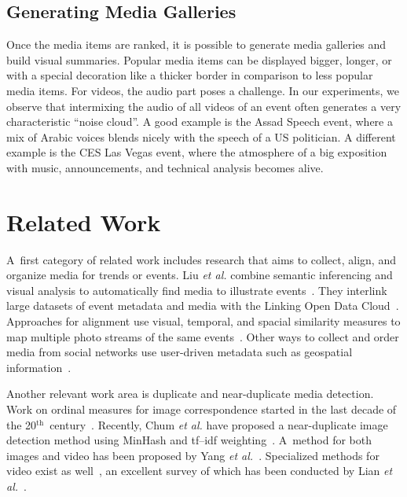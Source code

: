 \documentclass{acm_proc_article-sp}
\let\oldemph\emph
\renewcommand{\emph}[1]{\oldemph{\fontsize{9}{9}\selectfont #1}}
\newcommand{\superscript}[1]{\ensuremath{^{\textrm{#1}}}}
\begin{document}
\subsection{Generating Media Galleries}
Once the media items are ranked, it is possible to generate media galleries and build visual summaries. Popular media items can be displayed bigger, longer, or with a special decoration like a thicker border in comparison to less popular media items. For videos, the audio part poses a challenge. In our experiments, we observe that intermixing the audio of all videos of an event often generates a very characteristic ``noise cloud''. A good example is the Assad Speech event, where a mix of Arabic voices blends nicely with the speech of a US politician. A different example is the CES Las Vegas event, where the atmosphere of a big exposition with music, announcements, and technical analysis becomes alive.


\section{Related Work}                                                      \label{sec:related-work}

A~first category of related work includes research that aims to collect, align, and organize media for trends or events.
Liu \emph{et al.} combine semantic inferencing and visual analysis to automatically find media to illustrate events~\cite{Liu:ICMR11}.
They interlink large datasets of event metadata and media with the Linking Open Data Cloud~\cite{LODcloud}.
Approaches for alignment use visual, temporal, and spacial similarity measures to map multiple photo streams of the same events~\cite{Yang2011}.
Other ways to collect and order media from social networks use user-driven metadata such as geospatial information~\cite{Crandall}.

Another relevant work area is duplicate and near-duplicate media detection. Work on ordinal measures for image correspondence started in the last decade of the 20\superscript{th}~century~\cite{Bhat}. Recently, Chum \emph{et al.} have proposed a near-duplicate image detection method using MinHash and tf--idf weighting~\cite{Chum}. A~method for both images and video has been proposed by Yang \emph{et al.}~\cite{Yang}. Specialized methods for video exist as well~\cite{Min, Wu}, an excellent survey of which has been conducted by Lian \emph{et al.}~\cite{Lian}.
\end{document}
